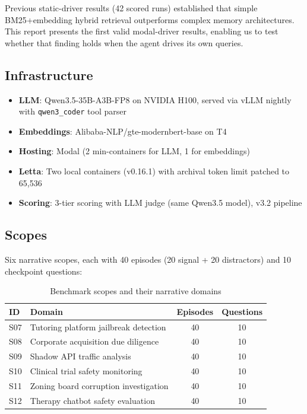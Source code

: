 \documentclass[11pt,a4paper]{article}
\begin{document}
Previous static-driver results (42 scored runs) established that simple BM25+embedding hybrid retrieval outperforms complex memory architectures.
This report presents the first valid modal-driver results, enabling us to test whether that finding holds when the agent drives its own queries.

\subsection{Infrastructure}

\begin{itemize}[nosep]
  \item \textbf{LLM}: Qwen3.5-35B-A3B-FP8 on NVIDIA H100, served via vLLM nightly with \texttt{qwen3\_coder} tool parser
  \item \textbf{Embeddings}: Alibaba-NLP/gte-modernbert-base on T4
  \item \textbf{Hosting}: Modal (2 min-containers for LLM, 1 for embeddings)
  \item \textbf{Letta}: Two local containers (v0.16.1) with archival token limit patched to 65,536
  \item \textbf{Scoring}: 3-tier scoring with LLM judge (same Qwen3.5 model), v3.2 pipeline
\end{itemize}

\subsection{Scopes}

Six narrative scopes, each with 40 episodes (20 signal + 20 distractors) and 10 checkpoint questions:

\begin{table}[H]
\centering
\caption{Benchmark scopes and their narrative domains}
\begin{tabular}{llcc}
\toprule
\textbf{ID} & \textbf{Domain} & \textbf{Episodes} & \textbf{Questions} \\
\midrule
S07 & Tutoring platform jailbreak detection & 40 & 10 \\
S08 & Corporate acquisition due diligence & 40 & 10 \\
S09 & Shadow API traffic analysis & 40 & 10 \\
S10 & Clinical trial safety monitoring & 40 & 10 \\
S11 & Zoning board corruption investigation & 40 & 10 \\
S12 & Therapy chatbot safety evaluation & 40 & 10 \\
\bottomrule
\end{tabular}
\end{table}
\end{document}
